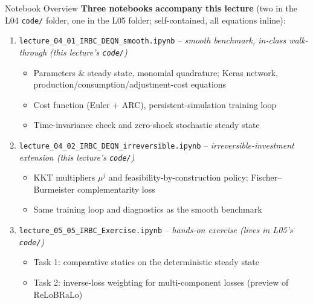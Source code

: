 \documentclass[aspectratio=169,11pt]{beamer}
\begin{document}
\begin{frame}{Notebook Overview}
\footnotesize
\textbf{Three notebooks accompany this lecture} (two in the L04 \texttt{code/} folder, one in the L05 folder; self-contained, all equations inline):

\vspace{0.2em}
\begin{enumerate}\itemsep1pt
    \item \texttt{lecture\_04\_01\_IRBC\_DEQN\_smooth.ipynb} -- \emph{smooth benchmark, in-class walk-through (this lecture's \texttt{code/})}
    \begin{itemize}\itemsep0pt
        \item Parameters \& steady state, monomial quadrature; Keras network, production/consumption/adjustment-cost equations
        \item Cost function (Euler + ARC), persistent-simulation training loop
        \item Time-invariance check and zero-shock stochastic steady state
    \end{itemize}

    \item \texttt{lecture\_04\_02\_IRBC\_DEQN\_irreversible.ipynb} -- \emph{irreversible-investment extension (this lecture's \texttt{code/})}
    \begin{itemize}\itemsep0pt
        \item KKT multipliers $\mu^j$ and feasibility-by-construction policy; Fischer--Burmeister complementarity loss
        \item Same training loop and diagnostics as the smooth benchmark
    \end{itemize}

    \item \texttt{lecture\_05\_05\_IRBC\_Exercise.ipynb} -- \emph{hands-on exercise (lives in L05's \texttt{code/})}
    \begin{itemize}\itemsep0pt
        \item Task 1: comparative statics on the deterministic steady state
        \item Task 2: inverse-loss weighting for multi-component losses (preview of ReLoBRaLo)
    \end{itemize}
\end{enumerate}
\end{frame}
\end{document}

